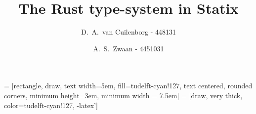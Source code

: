 \documentclass[sigplan,screen]{acmart}
\title{The Rust type-system in Statix}
\author{
D.\ A.\ van Cuilenborg - 448131
\and
A.\ S.\ Zwaan - 4451031}
\begin{document}
\renewcommand{\sectionautorefname}{Section}
\renewcommand{\chapterautorefname}{Chapter}
\let\subsectionautorefname\sectionautorefname
\let\subsubsectionautorefname\sectionautorefname

\newcommand{\lowspacingitem}[0]{\itemsep0.2em}


\newcommand{\nl}[0]{\bigbreak

}

 = [rectangle, draw, text width=5em, fill=tudelft-cyan!127, text centered, rounded corners, minimum height=3em, minimum width = 7.5em]
 = [draw, very thick, color=tudelft-cyan!127, -latex']

%

\maketitle









\end{document}
